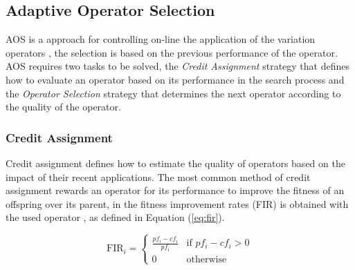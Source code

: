 \documentclass[journal]{IEEEtran}
\begin{document}
\subsection{Adaptive Operator Selection}
AOS is a approach for controlling on-line the application of the variation operators \cite{hitomi2016classification}, the selection is based on the previous performance of the operator.
AOS requires two tasks to be solved, the \textit{Credit Assignment} strategy that defines how to evaluate an operator based on its performance in the search process and the \textit{Operator Selection} strategy that determines the next operator according to the quality of the operator.

\subsubsection{Credit Assignment}
Credit assignment defines how to estimate the quality of operators based on the impact of their recent applications.
The most common method of credit assignment rewards an operator for its performance to improve the fitness of an offspring over its parent, in \cite{lin2016adaptive} the fitness improvement rates (FIR) is obtained with the used operator
, as defined in Equation (\ref{eq:fir}).

\begin{equation}
  \text{FIR}_{i}=\left\{
  \begin{array}{ll}
    \frac{pf_{i}-cf_{i}}{pf_{i}} & \text{if }pf_{i}-cf_{i}>0 \\

    0                            & \text{otherwise}
  \end{array}
  \right.
  \label{eq:fir}
\end{equation}
\end{document}
